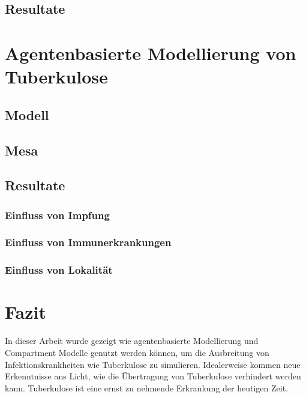 \documentclass[paper=a4, fontsize=11pt, ngerman, abstract=on]{scrartcl}
\numberwithin{equation}{section} %
\numberwithin{figure}{section} %
\numberwithin{table}{section} %
\begin{document}
\blindtext

\subsection{Resultate}

\blindtext

\section{Agentenbasierte Modellierung von Tuberkulose}

\blindtext

\subsection{Modell}

\blindtext

\subsection{Mesa}

\blindtext

\subsection{Resultate}

\blindtext

\subsubsection{Einfluss von Impfung}

\blindtext

\subsubsection{Einfluss von Immunerkrankungen}

\blindtext

\subsubsection{Einfluss von Lokalität}

\blindtext

\section{Fazit}

In dieser Arbeit wurde gezeigt wie agentenbasierte Modellierung und Compartment Modelle genutzt werden können, um die Ausbreitung von Infektionskrankheiten wie Tuberkulose zu simulieren. Idealerweise kommen neue Erkenntnisse ans Licht, wie die Übertragung von Tuberkulose verhindert werden kann. Tuberkulose ist eine ernst zu nehmende Erkrankung der heutigen Zeit.

\newpage



\end{document}
